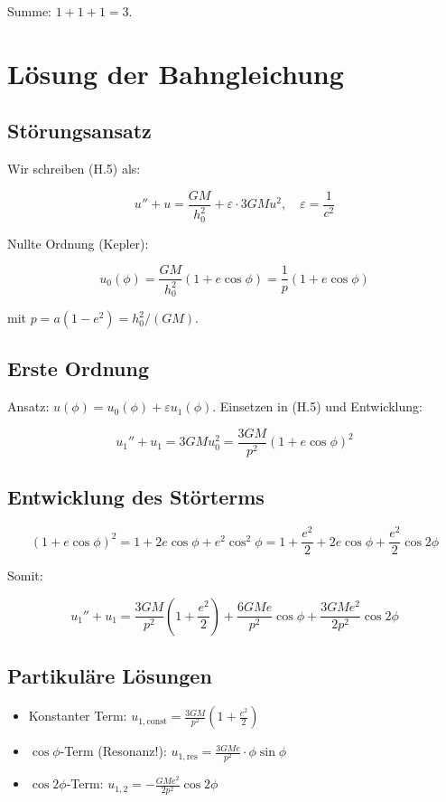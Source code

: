 Summe: \( 1 + 1 + 1 = 3 \).

\section{Lösung der Bahngleichung}
\label{app:periheldrehung_loesung}

\subsection{Störungsansatz}
\label{sub:periheldrehung_stoerung}

Wir schreiben (H.5) als:

\[
u'' + u = \frac{GM}{h_0^2} + \varepsilon \cdot 3GM u^2, \quad \varepsilon = \frac{1}{c^2}
\]

Nullte Ordnung (Kepler):

\[
u_0(\phi) = \frac{GM}{h_0^2} (1 + e \cos \phi) = \frac{1}{p} (1 + e \cos \phi)
\]

mit \( p = a(1-e^2) = h_0^2/(GM) \).

\subsection{Erste Ordnung}
\label{sub:periheldrehung_erste_ordnung}

Ansatz: \( u(\phi) = u_0(\phi) + \varepsilon u_1(\phi) \). Einsetzen in (H.5) und Entwicklung:

\[
u_1'' + u_1 = 3GM u_0^2 = \frac{3GM}{p^2} (1 + e \cos \phi)^2
\]

\subsection{Entwicklung des Störterms}
\label{sub:periheldrehung_stoerterm}

\[
(1 + e \cos \phi)^2 = 1 + 2e \cos \phi + e^2 \cos^2 \phi
= 1 + \frac{e^2}{2} + 2e \cos \phi + \frac{e^2}{2} \cos 2\phi
\]

Somit:

\[
u_1'' + u_1 = \frac{3GM}{p^2} \left(1 + \frac{e^2}{2}\right) 
+ \frac{6GM e}{p^2} \cos \phi 
+ \frac{3GM e^2}{2p^2} \cos 2\phi
\]

\subsection{Partikuläre Lösungen}
\label{sub:periheldrehung_partikulaer}

\begin{itemize}
    \item Konstanter Term: \( u_{1,\text{const}} = \frac{3GM}{p^2} \left(1 + \frac{e^2}{2}\right) \)
    \item \( \cos \phi \)-Term (Resonanz!): 
          \( u_{1,\text{res}} = \frac{3GM e}{p^2} \cdot \phi \sin \phi \)
    \item \( \cos 2\phi \)-Term: 
          \( u_{1,2} = -\frac{GM e^2}{2p^2} \cos 2\phi \)
\end{itemize}

